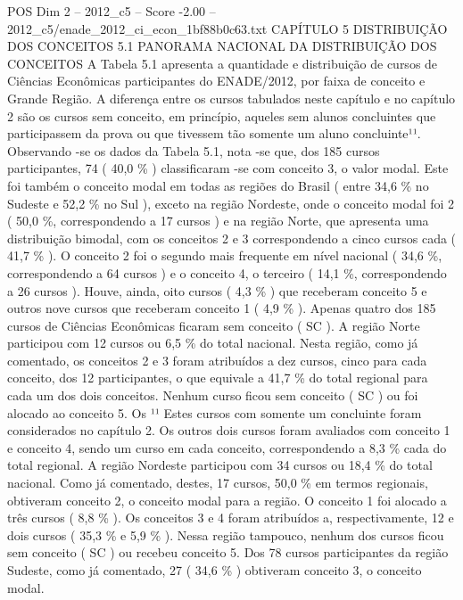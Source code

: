 \begin{textsample}{POS Dim 2 – 2012\_c5 – Score -2.00 – 2012\_c5/enade\_2012\_ci\_econ\_1bf88b0c63.txt}  \label{ex:f2_pos_362}
CAPÍTULO 5 DISTRIBUIÇÃO DOS CONCEITOS 5.1 PANORAMA NACIONAL DA DISTRIBUIÇÃO DOS CONCEITOS A Tabela 5.1 apresenta a quantidade e distribuição de cursos de Ciências Econômicas participantes do ENADE/2012, por faixa de conceito e Grande Região.
A diferença entre os cursos tabulados neste capítulo e no capítulo 2 são os cursos sem conceito, em princípio, aqueles sem alunos concluintes que participassem da prova ou que tivessem tão somente um aluno concluinte¹¹.
Observando -se os dados da Tabela 5.1, nota -se que, dos 185 cursos participantes, 74 ( 40,0 \% ) classificaram -se com conceito 3, o valor modal.
Este foi também o conceito modal em todas as regiões do Brasil ( entre 34,6 \% no Sudeste e 52,2 \% no Sul ), exceto na região Nordeste, onde o conceito modal foi 2 ( 50,0 \%, correspondendo a 17 cursos ) e na região Norte, que apresenta uma distribuição bimodal, com os conceitos 2 e 3 correspondendo a cinco cursos cada ( 41,7 \% ).
O conceito 2 foi o segundo mais frequente em nível nacional ( 34,6 \%, correspondendo a 64 cursos ) e o conceito 4, o terceiro ( 14,1 \%, correspondendo a 26 cursos ).
Houve, ainda, oito cursos ( 4,3 \% ) que receberam conceito 5 e outros nove cursos que receberam conceito 1 ( 4,9 \% ).
Apenas quatro dos 185 cursos de Ciências Econômicas ficaram sem conceito ( SC ).
A região Norte participou com 12 cursos ou 6,5 \% do total nacional.
Nesta região, como já comentado, os conceitos 2 e 3 foram atribuídos a dez cursos, cinco para cada conceito, dos 12 participantes, o que equivale a 41,7 \% do total regional para cada um dos dois conceitos.
Nenhum curso ficou sem conceito ( SC ) ou foi alocado ao conceito 5.
Os ¹¹ Estes cursos com somente um concluinte foram considerados no capítulo 2.
Os outros dois cursos foram avaliados com conceito 1 e conceito 4, sendo um curso em cada conceito, correspondendo a 8,3 \% cada do total regional.
A região Nordeste participou com 34 cursos ou 18,4 \% do total nacional.
Como já comentado, destes, 17 cursos, 50,0 \% em termos regionais, obtiveram conceito 2, o conceito modal para a região.
O conceito 1 foi alocado a três cursos ( 8,8 \% ).
Os conceitos 3 e 4 foram atribuídos a, respectivamente, 12 e dois cursos ( 35,3 \% e 5,9 \% ).
Nessa região tampouco, nenhum dos cursos ficou sem conceito ( SC ) ou recebeu conceito 5.
Dos 78 cursos participantes da região Sudeste, como já comentado, 27 ( 34,6 \% ) obtiveram conceito 3, o conceito modal.

\end{textsample}
